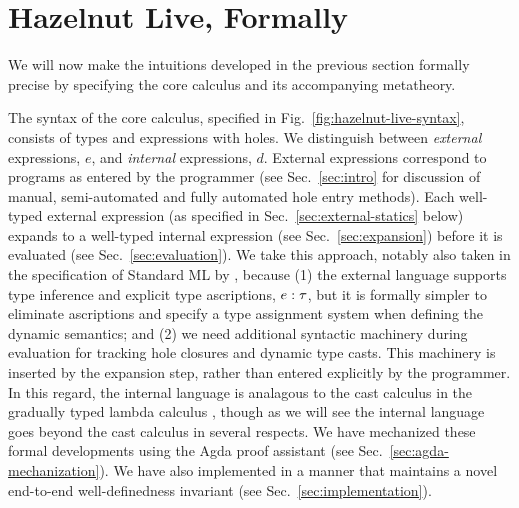 
\clearpage
\newcommand{\calculusSec}{Hazelnut Live, Formally}
\section{\protect\calculusSec}
\label{sec:calculus}



We will now make the intuitions developed in the previous section formally precise by specifying the \HazelnutLive core calculus and  its accompanying metatheory. 

The syntax of the core calculus, specified in Fig.~\ref{fig:hazelnut-live-syntax}, consists of types and expressions with holes. 
We distinguish between \emph{external} expressions, $e$, and \emph{internal} expressions, $d$. 
External expressions correspond to programs as entered by the programmer 
(see Sec.~\ref{sec:intro} for discussion of manual, semi-automated and fully automated hole entry methods). 
Each well-typed external expression (as specified in Sec.~\ref{sec:external-statics} below) expands to a well-typed internal expression (see Sec.~\ref{sec:expansion}) before it is evaluated (see Sec.~\ref{sec:evaluation}). 
We take this approach, notably also taken in the specification of Standard ML by \citet{Harper00atype-theoretic}, because (1) the external language supports type inference and explicit type ascriptions, $e : \tau$, but it is formally simpler to eliminate ascriptions and specify a type assignment system when defining the dynamic semantics; and 
(2) we need additional syntactic machinery during evaluation for tracking hole closures and dynamic type casts. 
This machinery is inserted by the expansion step, rather than entered explicitly by the programmer. 
In this regard, the internal language is analagous to the cast calculus in the gradually typed lambda calculus \cite{DBLP:conf/snapl/SiekVCB15,Siek06a}, though as we will see the \HazelnutLive internal language goes beyond the cast calculus in several respects. We have mechanized these formal developments using the Agda proof assistant \cite{norell:thesis,norell2009dependently} 
(see Sec.~\ref{sec:agda-mechanization}). We have also implemented \HazelnutLive in a manner that maintains a novel end-to-end well-definedness invariant (see Sec.~\ref{sec:implementation}).


